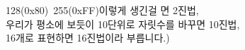 \documentclass[preview]{standalone}
\begin{document}
\begin{center}
128(0x80)~255(0xFF)이렇게 생긴걸 면 2진법,\\우리가 평소에 보듯이 10단위로 자릿수를 바꾸면 10진법,\\ 16개로 표현하면 16진법이라 부릅니다.)
\end{center}
\end{document}
